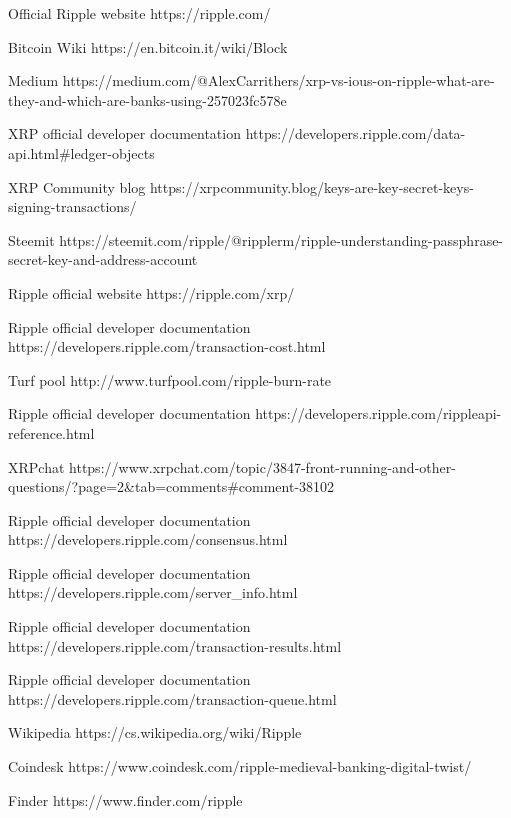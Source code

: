 \documentclass[hidelinks, titlepage]{article}
\begin{document}
\clearpage
\begin{thebibliography}{9}
Official Ripple website
https://ripple.com/

Bitcoin Wiki
https://en.bitcoin.it/wiki/Block

Medium
https://medium.com/@AlexCarrithers/xrp-vs-ious-on-ripple-what-are-they-and-which-are-banks-using-257023fc578e

XRP official developer documentation
https://developers.ripple.com/data-api.html\#ledger-objects

XRP Community blog
https://xrpcommunity.blog/keys-are-key-secret-keys-signing-transactions/


Steemit
https://steemit.com/ripple/@ripplerm/ripple-understanding-passphrase-secret-key-and-address-account

Ripple official website
https://ripple.com/xrp/

Ripple official developer documentation
https://developers.ripple.com/transaction-cost.html

Turf pool
http://www.turfpool.com/ripple-burn-rate

Ripple official developer documentation
https://developers.ripple.com/rippleapi-reference.html

XRPchat
https://www.xrpchat.com/topic/3847-front-running-and-other-questions/?page=2\&tab=comments\#comment-38102

Ripple official developer documentation
https://developers.ripple.com/consensus.html

Ripple official developer documentation
https://developers.ripple.com/server\_info.html

Ripple official developer documentation
https://developers.ripple.com/transaction-results.html

Ripple official developer documentation
https://developers.ripple.com/transaction-queue.html

Wikipedia
https://cs.wikipedia.org/wiki/Ripple

Coindesk
https://www.coindesk.com/ripple-medieval-banking-digital-twist/

Finder
https://www.finder.com/ripple

\end{thebibliography}
\clearpage
\end{document}
